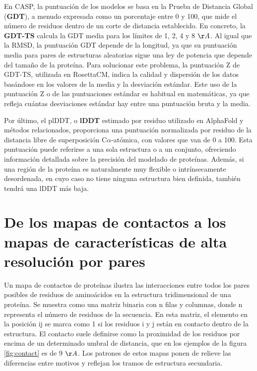 En CASP, la puntuación de los modelos se basa en la Prueba de Distancia Global (\textbf{GDT}), a menudo expresada como un porcentaje entre 0 y 100, que mide el número de residuos dentro de un corte de distancia establecido. En concreto, la \textbf{GDT-TS} calcula la GDT media para los límites de 1, 2, 4 y 8 $\AA$. Al igual que la RMSD, la puntuación GDT depende de la longitud, ya que su puntuación media para pares de estructuras aleatorias sigue una ley de potencia que depende del tamaño de la proteína. Para solucionar este problema, la puntuación Z de GDT-TS, utilizada en RosettaCM, indica la calidad y dispersión de los datos basándose en los valores de la media y la desviación estándar. Este uso de la puntuación Z o de las puntuaciones estándar es habitual en matemáticas, ya que refleja cuántas desviaciones estándar hay entre una puntuación bruta y la media.

Por último, el plDDT, o \textbf{lDDT} estimado por residuo utilizado en AlphaFold y métodos relacionados, proporciona una puntuación normalizada por residuo de la distancia libre de superposición C$\alpha$-atómica, con valores que van de 0 a 100. Esta puntuación puede referirse a una sola estructura o a un conjunto, ofreciendo información detallada sobre la precisión del modelado de proteínas. Además, si una región de la proteína es naturalmente muy flexible o intrínsecamente desordenada, en cuyo caso no tiene ninguna estructura bien definida, también tendrá una lDDT más baja.

\section{De los mapas de contactos a los mapas de características de alta resolución por pares}
Un mapa de contactos de proteínas ilustra las interacciones entre todos los pares posibles de residuos de aminoácidos en la estructura tridimensional de una proteína. Se muestra como una matriz binaria con n filas y columnas, donde n representa el número de residuos de la secuencia. En esta matriz, el elemento en la posición ij se marca como 1 si los residuos i y j están en contacto dentro de la estructura. El contacto suele definirse como la proximidad de los residuos por encima de un determinado umbral de distancia, que en los ejemplos de la figura \ref{fig:contact} es de 9 $\AA$. Los patrones de estos mapas ponen de relieve las diferencias entre motivos y reflejan los tramos de estructura secundaria.

